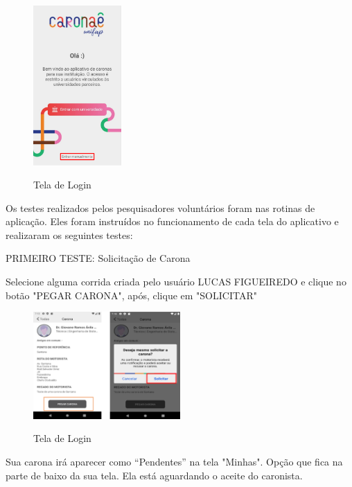 \begin{figure}[H]
	\centering
	\caption{Tela de Login}
	\includegraphics[width=0.3\textwidth]{./04-figuras/teLa_de_login.png}
	\label{fig:tela_inicial_caronae}
\end{figure}

Os testes realizados pelos pesquisadores voluntários foram nas rotinas de aplicação. Eles foram instruídos no funcionamento de cada tela do aplicativo e realizaram os seguintes testes:

PRIMEIRO TESTE: Solicitação de Carona

Selecione alguma corrida criada pelo usuário LUCAS FIGUEIREDO e clique no botão
"PEGAR CARONA", após, clique em "SOLICITAR"

\begin{figure}[H]
	\centering
	\caption{Tela de Login}
	\includegraphics[width=0.5\textwidth]{./04-figuras/manual/solicitacao_de_carona.png}
	\label{fig:solicitacao_de_carona}
\end{figure}

Sua carona irá aparecer como “Pendentes” na tela "Minhas". Opção que fica na parte de baixo da sua tela. Ela está aguardando o aceite do caronista.

